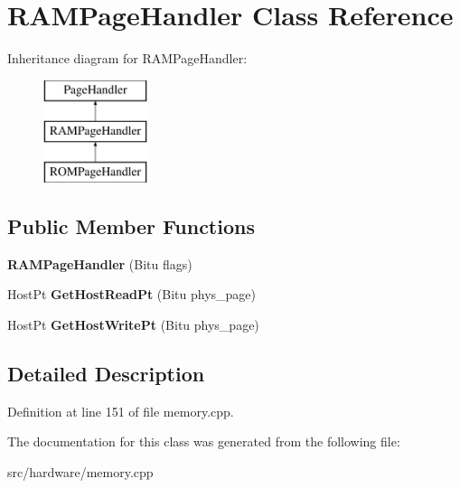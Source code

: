 \hypertarget{classRAMPageHandler}{\section{R\-A\-M\-Page\-Handler Class Reference}
\label{classRAMPageHandler}
}
Inheritance diagram for R\-A\-M\-Page\-Handler\-:\begin{figure}[H]
\begin{center}
\leavevmode
\includegraphics[height=3.000000cm]{classRAMPageHandler}
\end{center}
\end{figure}
\subsection*{Public Member Functions}
\begin{DoxyCompactItemize}
\item 
\hypertarget{classRAMPageHandler_a1a9d31214da07316be390b315bd48344}{{\bfseries R\-A\-M\-Page\-Handler} (Bitu flags)}\label{classRAMPageHandler_a1a9d31214da07316be390b315bd48344}

\item 
\hypertarget{classRAMPageHandler_aa96438cf48e183202b6d9bdef1ff858a}{Host\-Pt {\bfseries Get\-Host\-Read\-Pt} (Bitu phys\-\_\-page)}\label{classRAMPageHandler_aa96438cf48e183202b6d9bdef1ff858a}

\item 
\hypertarget{classRAMPageHandler_a08d7b2d963c5afb626c6aea199bc3a1b}{Host\-Pt {\bfseries Get\-Host\-Write\-Pt} (Bitu phys\-\_\-page)}\label{classRAMPageHandler_a08d7b2d963c5afb626c6aea199bc3a1b}

\end{DoxyCompactItemize}


\subsection{Detailed Description}


Definition at line 151 of file memory.\-cpp.



The documentation for this class was generated from the following file\-:\begin{DoxyCompactItemize}
\item 
src/hardware/memory.\-cpp\end{DoxyCompactItemize}
